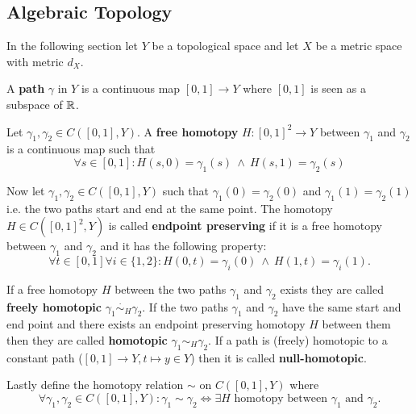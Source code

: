\subsection{Algebraic Topology}
In the following section let $Y$ be a topological space and let $X$ be a metric space with metric $d_X$.

\begin{defin}
  A \textbf{path} $\gamma$ in $Y$ is a continuous map $[0,1] \to Y$ where $[0,1]$ is seen as a subspace of $\mathbb{R}$.
\end{defin}

\begin{defin}
  Let $\gamma_1, \gamma_2 \in C([0, 1], Y)$. A \textbf{free homotopy} $H\colon [0,1]^2 \to Y$ between $\gamma_1$ and $\gamma_2$ is a continuous map such that
  \begin{equation*}
    \forall s \in [0,1]\colon H(s, 0) = \gamma_1(s) \: \land \: H(s, 1) = \gamma_2(s)
  \end{equation*}

  Now let $\gamma_1, \gamma_2 \in C([0, 1], Y)$ such that $\gamma_1(0) = \gamma_2(0)$ and $\gamma_1(1) = \gamma_2(1)$ i.e. the two paths start and end at the same point.
  The homotopy $H \in C([0,1]^2, Y)$ is called \textbf{endpoint preserving} if it is a free homotopy between $\gamma_1$ and $\gamma_2$ and it has the following property:
  \begin{equation*}
    \forall t\in[0,1]\forall i\in \{1,2\}\colon H(0, t) = \gamma_i(0) \: \land \: H(1, t) = \gamma_i(1).
  \end{equation*}

  If a free homotopy $H$ between the two paths $\gamma_1$ and $\gamma_2$ exists they are called \textbf{freely homotopic} $\gamma_1 \overset{\cdot}{\sim}_H \gamma_2$.
  If the two paths $\gamma_1$ and $\gamma_2$ have the same start and end point and there exists an endpoint preserving homotopy $H$ between them then they are called 
  \textbf{homotopic} $\gamma_1 \sim_H \gamma_2$. If a path is (freely) homotopic to a constant path ($[0,1] \to Y, t \mapsto y \in Y$) then it is called \textbf{null-homotopic}.

  Lastly define the homotopy relation $\sim$ on $C([0,1], Y)$ where 
  \begin{equation*}
    \forall\gamma_1, \gamma_2 \in C([0,1], Y)\colon \gamma_1 \sim \gamma_2 \iff \exists H \text{ homotopy between } \gamma_1 \text{ and } \gamma_2.
  \end{equation*}
\end{defin}

